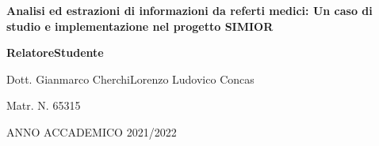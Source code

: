 \vspace{2.6cm}


\begin{center}
\textbf{\LARGE Analisi ed estrazioni di informazioni da referti medici:
Un caso di studio e implementazione nel progetto
SIMIOR}\par
\end{center}{\LARGE \par}



\begin{spacing}{0.90}
\vspace{3.7cm}
\textbf{\large Relatore}{\large \hfill{}}\textbf{\large Studente}{\large \par}
\end{spacing}

{\large Dott. Gianmarco Cherchi\hfill{}Lorenzo Ludovico Concas~}{\large \par}

\begin{spacing}{0.90}
{\large \hfill{}Matr. N. 65315}{\large \par}
\end{spacing}

\vspace{2.5cm}


\begin{center}
ANNO ACCADEMICO 2021/2022\par 
\end{center}